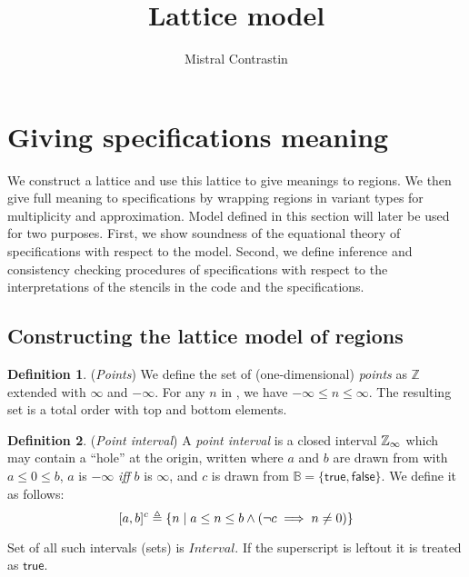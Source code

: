 \documentclass[acmlarge,review]{acmart}
\theoremstyle{definition}
\newtheorem{defn}{Definition}
\theoremstyle{plain}
\theoremstyle{remark}
\begin{document}
\title{Lattice model}
\author{Mistral Contrastin}

\section{Giving specifications meaning}

We construct a lattice and use this lattice to give meanings to regions. We
then give full meaning to specifications by wrapping regions in variant types
for multiplicity and approximation. Model defined in this section will later be
used for two purposes. First, we show soundness of the equational theory of
specifications with respect to the model. Second, we define inference and
consistency checking procedures of specifications with respect to the
interpretations of the stencils in the code and the specifications.

\subsection{Constructing the lattice model of regions}

\begin{defn}{(\emph{Points})}
  We define the set \zinf{} of (one-dimensional) \emph{points} as
  $\mathbb{Z}$ extended with $\infty$ and $-\infty$. For any $n$ in
  \zinf{}, we have $-\infty \leq n \leq \infty$. The resulting set is
  a total order with top and bottom elements.
\end{defn}

\begin{defn}{(\emph{Point interval})}
  A \emph{point interval} is a closed interval $\textnormal{$\mathbb{Z}_\infty$}$ which may
  contain a ``hole'' at the origin, written  where $a$ and $b$
  are drawn from \zinf{} with $a \leq 0 \leq b$, $a$ is $-\infty$ \emph{iff} $b$
  is $\infty$, and $c$ is drawn from $\mathbb{B} = \{ \mathsf{true}, \mathsf{false} \}$. We
  define it as follows:
%
  \begin{equation*}
    \textnormal{$\lbrack a,b\rbrack^{c}$} \triangleq
      \{ n \;|\; a \leq n \leq b \wedge (\neg c \implies n \neq 0) \}
  \end{equation*}

  Set of all such intervals (sets) is $\textit{Interval}$. If the superscript is
  leftout it is treated as $\mathsf{true}$.
\end{defn}
\end{document}
